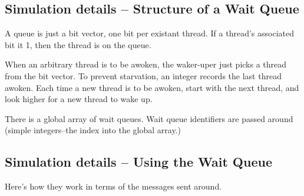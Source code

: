 \subsection{Simulation details -- Structure of a Wait Queue}

A queue is just a bit vector, one bit per existant thread.  If a
thread's associated bit it 1, then the thread is on the queue.

When an arbitrary thread is to be awoken, the waker-uper just picks a
thread from the bit vector.  To prevent starvation, an integer records
the last thread awoken.  Each time a new thread is to be awoken, start
with the next thread, and look higher for a new thread to wake
up.

There is a global array of wait queues.  Wait queue identifiers are
passed around (simple integers--the index into the global array.)

\subsection{Simulation details -- Using the Wait Queue}

Here's how they work in terms of the messages sent around.

